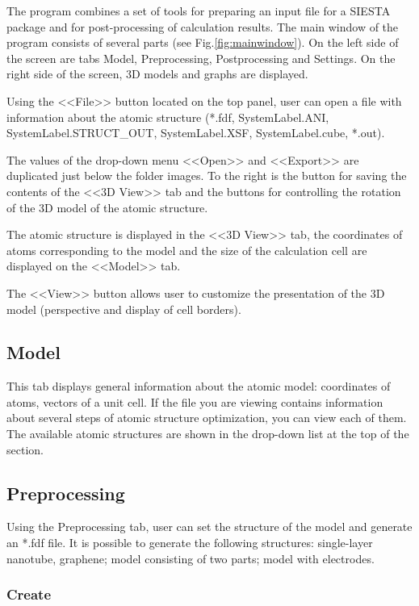 \documentclass{article}
\begin{document}
The program combines a set of tools for preparing an input file for a SIESTA package and for post-processing of calculation results. The main window of the program consists of several parts (see Fig.\ref{fig:mainwindow}). On the left side of the screen are tabs Model, Preprocessing, Postprocessing and Settings. On the right side of the screen, 3D models and graphs are displayed.

Using the <<File>> button located on the top panel, user can open a file with information about the atomic structure (*.fdf, SystemLabel.ANI, SystemLabel.STRUCT\_OUT, SystemLabel.XSF, SystemLabel.cube, *.out).

The values of the drop-down menu <<Open>> and <<Export>> are duplicated just below the folder images. To the right is the button for saving the contents of the <<3D View>> tab and the buttons for controlling the rotation of the 3D model of the atomic structure.

The atomic structure is displayed in the <<3D View>> tab, the coordinates of atoms corresponding to the model and the size of the calculation cell are displayed on the <<Model>> tab.

The <<View>> button allows user to customize the presentation of the 3D model (perspective and display of cell borders).

	
\subsection{Model}

This tab displays general information about the atomic model: coordinates of atoms, vectors of a unit cell. If the file you are viewing contains information about several steps of atomic structure optimization, you can view each of them. The available atomic structures are shown in the drop-down list at the top of the section.

\subsection{Preprocessing}

Using the Preprocessing tab, user can set the structure of the model and generate an *.fdf file. It is possible to generate the following structures: single-layer nanotube, graphene; model consisting of two parts; model with electrodes.

\subsubsection{Create}
\end{document}
